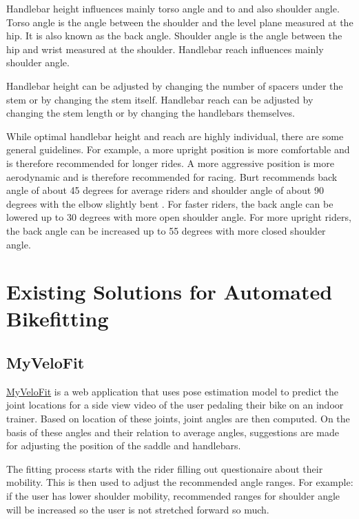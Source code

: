 Handlebar height influences mainly torso angle and to and also shoulder angle. Torso angle is the angle between the shoulder and the level plane measured at the hip. It is also known as the back angle. Shoulder angle is the angle between the hip and wrist measured at the shoulder. Handlebar reach influences mainly shoulder angle.

Handlebar height can be adjusted by changing the number of spacers under the stem or by changing the stem itself. Handlebar reach can be adjusted by changing the stem length or by changing the handlebars themselves.

While optimal handlebar height and reach are highly individual, there are some general guidelines. For example, a more upright position is more comfortable and is therefore recommended for longer rides. A more aggressive position is more aerodynamic and is therefore recommended for racing. Burt recommends back angle of about 45 degrees for average riders and shoulder angle of about 90 degrees with the elbow slightly bent \cite{burtbikefit}. For faster riders, the back angle can be lowered up to 30 degrees with more open shoulder angle. For more upright riders, the back angle can be increased up to 55 degrees with more closed shoulder angle.



\section{Existing Solutions for Automated Bikefitting}

\subsection{MyVeloFit}
\href{https://www.myvelofit.com/}{MyVeloFit}  is a web application that uses pose estimation model to predict the joint locations for a side view video of the user pedaling their bike on an indoor trainer. Based on location of these joints, joint angles are then computed. On the basis of these angles and their relation to average angles, suggestions are made for adjusting the position of the saddle and handlebars.

The fitting process starts with the rider filling out questionaire about their mobility. This is then used to adjust the recommended angle ranges. For example: if the user has lower shoulder mobility, recommended ranges for shoulder angle will be increased so the user is not stretched forward so much.

